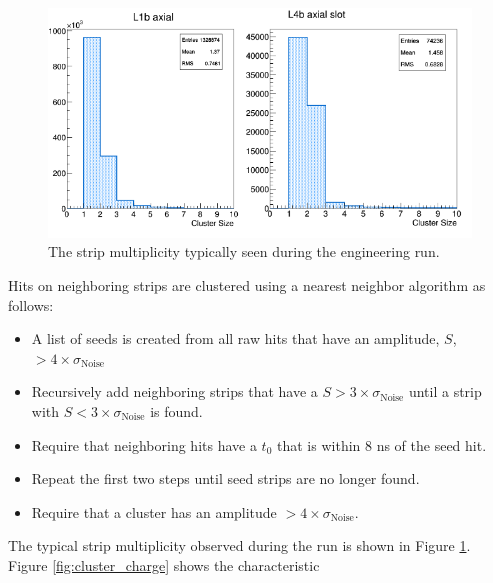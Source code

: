 \begin{figure}[h!t]
    \centering
    \includegraphics[width=\textwidth]{images/cluster_size.png}
    \caption{The strip multiplicity typically seen during the engineering run.}
    \label{fig:strip_mult}
\end{figure}  
Hits on neighboring strips are clustered using a nearest neighbor
algorithm as follows: 
\begin{itemize}
    \item A list of seeds is created from all raw hits that have an amplitude, $S$,
          $> 4\times \sigma_{\text{Noise}}$
  \item Recursively add neighboring strips that have a $S> 3 \times \sigma_{\text{Noise}}$
          until a strip with $S < 3\times \sigma_{\text{Noise}}$ is found.
      \item Require that neighboring hits have a $t_{0}$ that is within 8 ns of the seed hit.
    \item Repeat the first two steps until seed strips are no longer found.
\item Require that a cluster has an amplitude $> 4 \times \sigma_{\text{Noise}}$.
\end{itemize}
The typical strip multiplicity observed during the run is shown in Figure 
\ref{fig:strip_mult}. Figure \ref{fig:cluster_charge} shows the characteristic
